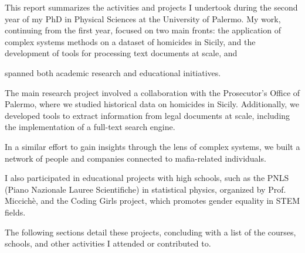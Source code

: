 This report summarizes the activities and projects I undertook during
the second year of my PhD in Physical Sciences at the University of
Palermo. My work, continuing from the first year, focused on two main fronts:
the application of complex systems methods on a dataset of homicides in Sicily,
and the development of tools for processing text documents at scale, and



spanned both academic research and educational initiatives.

The main research project involved a collaboration with the
Prosecutor's Office of Palermo, where we studied historical data on
homicides in Sicily. Additionally, we developed tools to extract
information from legal documents at scale, including the
implementation of a full-text search engine.

In a similar effort to gain insights through the lens of complex
systems, we built a network of people and companies connected to
mafia-related individuals.

I also participated in educational projects with high schools, such
as the PNLS (Piano Nazionale Lauree Scientifiche) in statistical
physics, organized by Prof. Miccichè, and the Coding Girls project,
which promotes gender equality in STEM fields.

The following sections detail these projects, concluding with a list
of the courses, schools, and other activities I attended or contributed to.